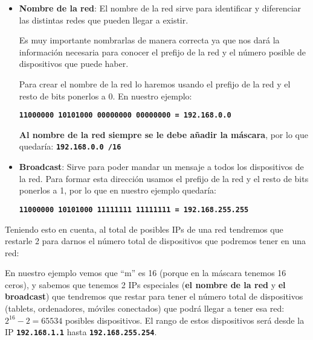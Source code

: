 \begin{itemize}
    \item \textbf{Nombre de la red}: El nombre de la red sirve para identificar y diferenciar las distintas redes que pueden llegar a existir.

    Es muy importante nombrarlas de manera correcta ya que nos dará la información necesaria para conocer el prefijo de la red y el número posible de dispositivos que puede haber.

    Para crear el nombre de la red lo haremos usando el prefijo de la red y el resto de bits ponerlos a 0. En nuestro ejemplo:

    \begin{center}
        \textbf{\texttt{11000000  10101000  00000000  00000000 = 192.168.0.0}}
    \end{center}

    \textbf{Al nombre de la red siempre se le debe añadir la máscara}, por lo que quedaría:  \texttt{\textbf{192.168.0.0 /16}}


    \item \textbf{Broadcast}: Sirve para poder mandar un mensaje a todos los dispositivos de la red. Para formar esta dirección usamos el prefijo de la red y el resto de bits ponerlos a 1, por lo que en nuestro ejemplo quedaría:

    \begin{center}
        \textbf{\texttt{11000000  10101000  11111111  11111111 = 192.168.255.255}}
    \end{center}
\end{itemize}

Teniendo esto en cuenta, al total de posibles IPs de una red tendremos que restarle 2 para darnos el número total de dispositivos que podremos tener en una red:



En nuestro ejemplo vemos que “m” es 16 (porque en la máscara tenemos 16 ceros), y sabemos que tenemos 2 IPs especiales (\textbf{el nombre de la red} y \textbf{el broadcast}) que tendremos que restar para tener el número total de dispositivos (tablets, ordenadores, móviles conectados) que podrá llegar a tener esa red:  $2^{16} - 2 = 65534$ posibles dispositivos. El rango de estos dispositivos será desde la IP \texttt{\textbf{192.168.1.1}} hasta \texttt{\textbf{192.168.255.254}}.


